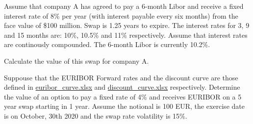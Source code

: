 \begin{question}
Assume that company A has agreed to pay a 6-month Libor and receive a fixed interest rate of 8\% per year (with interest payable every six months) from the face value of \$100 million. Swap is 1.25 years to expire. The interest rates for 3, 9 and 15 months are: 10\%, 10.5\% and 11\% respectively. Assume that interest rates are continously compounded. The 6-month Libor is currently 10.2\%. 

Calculate the value of this swap for company A.
\end{question}

\cprotEnv\begin{solution}
\begin{ipython}

\end{ipython}
\begin{ioutput}

\end{ioutput}
\end{solution}

\begin{question}
Suppouse that the EURIBOR Forward rates and the discount curve are those defined in
\href{https://github.com/matteosan1/finance_course/blob/develop/libro/input_files/euribor_curve.xlsx}{euribor\_curve.xlsx} and \href{https://github.com/matteosan1/finance_course/raw/develop/libro/input_files/discount_curve.xlsx}{discount\_curve.xlsx} respectively.
Determine the value of an option to pay a fixed rate of 4\% and receives EURIBOR on a 5 year swap starting in 1 year. Assume the notional is 100 EUR, the exercise date is on October, 30th 2020 and the swap rate volatility is 15\%.
\end{question}

